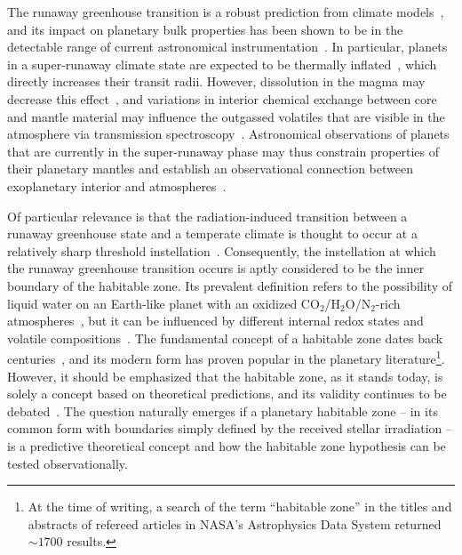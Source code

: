 \documentclass[twocolumn,twocolappendix]{aastex631}
\begin{document}
The runaway greenhouse transition is a robust prediction from climate models~\citep{Forget2014,Boukrouche2021,2022A&A...658A..40C}, and its impact on planetary bulk properties has been shown to be in the detectable range of current astronomical instrumentation~\citep{Goldblatt2015}.
In particular, planets in a super-runaway climate state are expected to be thermally inflated~\citep{Turbet2019,Turbet2020,Mousis2020}, which directly increases their transit radii.
However, dissolution in the magma may decrease this effect~\citep{Dorn2021}, and variations in interior chemical exchange between core and mantle material may influence the outgassed volatiles that are visible in the atmosphere via transmission spectroscopy~\citep{2021ApJ...914L...4L,2022PSJ.....3..127S}.
Astronomical observations of planets that are currently in the super-runaway phase may thus constrain properties of their planetary mantles and establish an observational connection between exoplanetary interior and atmospheres~\citep{2022arXiv220310023L,Wordsworth2022}.


Of particular relevance is that the radiation-induced transition between a runaway greenhouse state and a temperate climate is thought to occur at a relatively sharp threshold instellation~\citep{2010ppc..book.....P,2013ApJ...765..131K}.
Consequently, the instellation at which the runaway greenhouse transition occurs is aptly considered to be the inner boundary of the habitable zone.
Its prevalent definition refers to the possibility of liquid water on an Earth-like planet with an oxidized CO$_2$/H$_2$O/N$_2$-rich atmospheres~\citep[][]{Kasting1993,Kopparapu2013,Kopparapu2014}, but it can be influenced by different internal redox states and volatile compositions~\citep{2011ApJ...734L..13P,2017ApJ...837L...4R,2018ApJ...858...72R,2019ApJ...875...31K,2020ApJ...896..115G,2022JGRE..12707456G,2023ApJ...942L..20H}.
The fundamental concept of a habitable zone dates back centuries~\citep{Newton1687,Whewell1858,Shapley1953,Huang1959}, and its modern form has proven popular in the planetary literature\footnote{At the time of writing, a search of the term ``habitable zone'' in the titles and abstracts of refereed articles in NASA's Astrophysics Data System returned $\sim\num{1700}$ results.}.
However, it should be emphasized that the habitable zone, as it stands today, is solely a concept based on theoretical predictions, and its validity continues to be debated~\citep[e.g.,][]{Cockell2016,Moore2017,Tuchow2023}.
The question naturally emerges if a planetary habitable zone -- in its common form with boundaries simply defined by the received stellar irradiation -- is a predictive theoretical concept and how the habitable zone hypothesis can be tested observationally.
\end{document}
